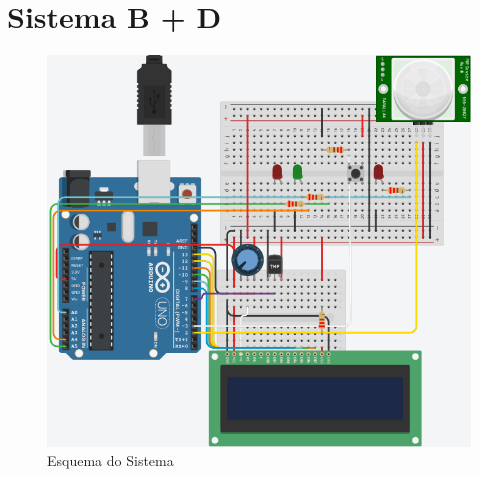 \newpage\section{Sistema B + D}

\begin{figure}[H]
    \centering
    \includegraphics[scale=0.6]{images/hardware/sisBD.png}
    \caption{Esquema do Sistema}
\end{figure}